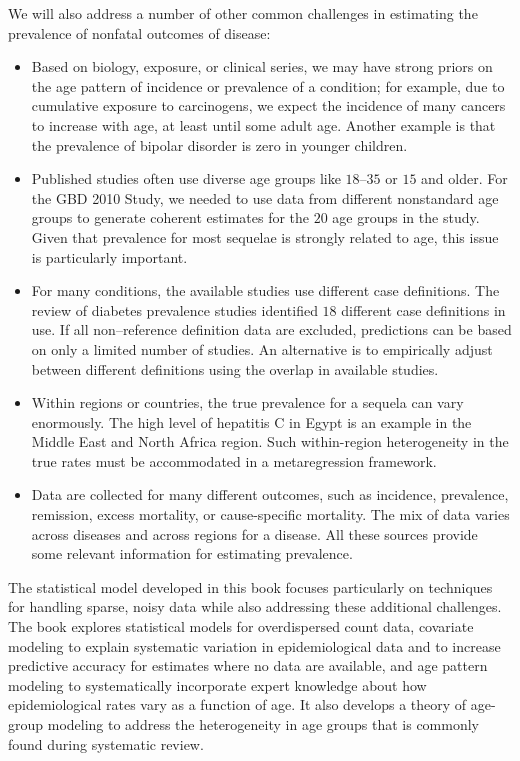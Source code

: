 We will also address a number of other common challenges in estimating the
prevalence of nonfatal outcomes of disease:
\begin{itemize}
\item Based on biology, exposure, or clinical series, we may have strong
priors on the age pattern of incidence or prevalence of a condition;
for example, due to cumulative exposure to carcinogens, we expect the
incidence of many cancers to increase with
age, at least until some
adult age.  Another example is that the prevalence of bipolar
disorder is zero in younger children.

\item Published studies often use diverse age groups like $18$--$35$
or $15$ and older.  For the GBD 2010 Study, we needed to use data from different
nonstandard age groups to generate coherent estimates for the $20$
age groups in the study.  Given that prevalence for most sequelae is
strongly related to age, this issue is particularly important.

\item For many conditions, the available studies use
different case definitions.  The review of diabetes prevalence studies
identified $18$ different case definitions in use.  If all non--reference
definition data are excluded, predictions can be based on only a
limited number of studies.  An alternative is to empirically
adjust between different definitions using the overlap
in available studies.

\item Within regions or
countries, the true prevalence for a sequela can vary enormously. The
high level of hepatitis C in Egypt is an example in the Middle East
and North Africa region.  Such within-region heterogeneity in the true
rates must be accommodated in a metaregression framework.

\item Data are collected for many different outcomes,
such as incidence, prevalence, remission, excess mortality, or
cause-specific mortality.  The mix of data varies across diseases and
across regions for a disease.  All these sources provide some
relevant information for estimating prevalence.
\end{itemize}

The statistical model developed in this book focuses
particularly on techniques for handling sparse, noisy data while also
addressing these additional challenges.  The book explores statistical
models for overdispersed count data, covariate modeling to explain
systematic variation in epidemiological data and to increase predictive
accuracy for estimates where no data are available, and age pattern
modeling to systematically incorporate expert knowledge about how
epidemiological rates vary as a function of age.  It also develops a
theory of age-group modeling to address the heterogeneity in
age groups that is commonly found during systematic review.

